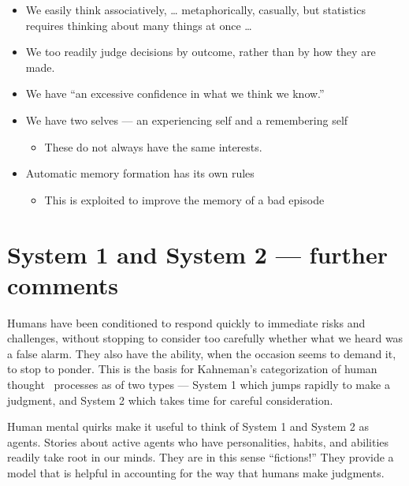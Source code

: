 \documentclass[
  10pt,
  b5paper]{book}
\providecommand{\tightlist}{%
  \setlength{\itemsep}{0pt}\setlength{\parskip}{0pt}}
\begin{document}
\begin{itemize}
\tightlist
\item
  We easily think associatively, \ldots{} metaphorically, casually,
  but statistics requires thinking about many things at once \ldots{}
\item
  We too readily judge decisions by outcome, rather than by how they are made.
\item
  We have ``an excessive confidence in what we think we know.''
\item
  We have two selves --- an experiencing self and a remembering self

  \begin{itemize}
  \tightlist
  \item
    These do not always have the same interests.
  \end{itemize}
\item
  Automatic memory formation has its own rules

  \begin{itemize}
  \tightlist
  \item
    This is exploited to improve the memory of a bad episode
  \end{itemize}
\end{itemize}

\hypertarget{system-1-and-system-2-further-comments}{%
\section{System 1 and System 2 --- further comments}\label{system-1-and-system-2-further-comments}}

Humans have been conditioned to respond quickly to immediate
risks and challenges, without stopping to consider too carefully
whether what we heard was a false alarm. They also have the
ability, when the occasion seems to demand it, to stop to ponder.
This is the basis for Kahneman's categorization of human thought~
processes as of two types --- System 1 which jumps rapidly to
make a judgment, and System 2 which takes time for careful
consideration.

Human mental quirks make it useful to think of System 1 and System 2
as agents. Stories about active agents who have personalities, habits,
and abilities readily take root in our minds. They are in this sense
``fictions!'' They provide a model that is helpful in accounting for
the way that humans make judgments.
\end{document}

